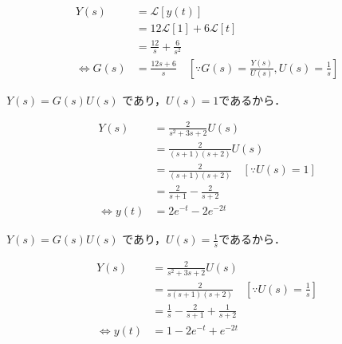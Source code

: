 \documentclass[a4paper,12pt]{article}
\begin{document}
\begin{tcolorbox}[title={[24] 単位ステップ応答が\(y(t)=12+6t\)であるとき，\\
    \qquad このシステムの伝達関数を求めよ． }]

    \begin{align*}
        Y(s)
        &= \mathcal{L} \left[ y(t) \right] \\
        &= 12\mathcal{L} \left[ 1 \right]+6 \mathcal{L} \left[ t \right]\\
        &= \frac{12}{s} + \frac{6}{s^2} \\
        \Leftrightarrow G(s) &= \frac{12s+6}{s} \quad [\because G(s)=\frac{Y(s)}{U(s)},U(s)=\frac{1}{s}]
    \end{align*}
\end{tcolorbox}
\begin{tcolorbox}[title={[25] 伝達関数が
    \[G(s)=\frac{2}{s^2+3s+2}\]
    \qquad であるときのインパルス応答を求めよ． }]

    \qquad \(Y(s) =G(s)U(s)\) であり，\(U(s)=1\)であるから． 

    \begin{align*}
        Y(s)
        &= \frac{2}{s^2+3s+2}U(s) \\
        &= \frac{2}{(s+1)(s+2)}U(s) \\
        &= \frac{2}{(s+1)(s+2)}\quad [\because U(s)=1]\\
        &= \frac{2}{s+1} - \frac{2}{s+2} \\
        \Leftrightarrow y(t) &= 2e^{-t} - 2e^{-2t}
    \end{align*}

\end{tcolorbox}
\begin{tcolorbox}[title={[26] 伝達関数が
    \[G(s)=\frac{2}{s^2+3s+2}\]
    \qquad であるときのステップ応答を求めよ．}]

    \qquad \(Y(s) =G(s)U(s)\) であり，\(U(s)=\frac{1}{s}\)であるから． 

    \begin{align*}
        Y(s)
        &= \frac{2}{s^2+3s+2}U(s) \\
        &= \frac{2}{s(s+1)(s+2)} \quad [\because U(s)=\frac{1}{s}]\\
        &= \frac{1}{s} - \frac{2}{s+1} + \frac{1}{s+2}\\
        \Leftrightarrow y(t) &=1 - 2e^{-t} + e^{-2t}
    \end{align*}

\end{tcolorbox}
\end{document}
